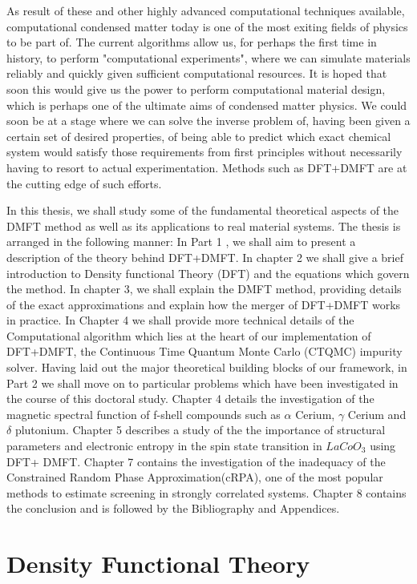 \documentclass[12pt,letter]{article}
\begin{document}
As result of these and other highly advanced computational techniques available, computational condensed matter today is one of the most exiting fields of physics to be part of. The current algorithms allow us, for perhaps the first time in history, to perform "computational experiments", where we can simulate materials reliably and quickly given sufficient computational resources. It is hoped that soon this would give us the power to perform computational material design, which is perhaps one of the ultimate aims of condensed matter physics. We could soon be at a stage where we can solve the inverse problem of, having been given a certain set of desired properties, of being able to predict which exact chemical system would satisfy those requirements from first principles without necessarily having to resort to actual experimentation. Methods such as DFT+DMFT are at the cutting edge of such efforts. 

In this thesis, we shall study some of the fundamental theoretical aspects of the DMFT method as well as its applications to real material systems. The thesis is arranged in the following manner: In Part 1 , we shall aim to present a description of the theory behind DFT+DMFT. In chapter 2 we shall give a brief introduction to Density functional Theory (DFT) and the equations which govern the method. In chapter 3, we shall explain the DMFT method, providing details of the exact approximations and explain how the merger of DFT+DMFT works in practice. In Chapter 4 we shall provide more technical details of the Computational algorithm which lies at the heart of our implementation of DFT+DMFT, the Continuous Time Quantum Monte Carlo (CTQMC) impurity solver. Having laid out the major theoretical building blocks of our framework, in Part 2 we shall move on to particular problems which have been investigated in the course of this doctoral study. Chapter 4 details the investigation of the magnetic spectral function of f-shell compounds such as $\alpha$ Cerium, $\gamma$ Cerium and $\delta$ plutonium. Chapter 5 describes a study of the the importance of structural parameters and electronic entropy in the spin state transition in $LaCoO_3$ using DFT+ DMFT. Chapter 7 contains the investigation of the inadequacy of the Constrained Random Phase Approximation(cRPA), one of the most popular methods to estimate screening in strongly correlated systems. Chapter 8 contains the conclusion and is followed by the Bibliography and Appendices.


\pagebreak
\section{Density Functional Theory}
\end{document}
